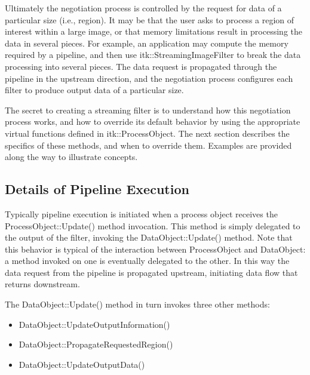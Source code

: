 \begin{figure}
  \par\centering
  \par
\end{figure}


Ultimately the negotiation process is controlled by the request for data of a
particular size (i.e., region). It may be that the user asks to process a
region of interest within a large image, or that memory limitations result in
processing the data in several pieces. For example, an application may
compute the memory required by a pipeline, and then use
itk::StreamingImageFilter to break the data processing into several pieces.
The data request is propagated through the pipeline in the upstream
direction, and the negotiation process configures each filter to produce
output data of a particular size.

The secret to creating a streaming filter is to understand how this
negotiation process works, and how to override its default behavior by using
the appropriate virtual functions defined in itk::ProcessObject. The next
section describes the specifics of these methods, and when to override
them. Examples are provided along the way to illustrate concepts.


\subsection{Details of Pipeline Execution}
\label{sec:DetailsPipelineExecution}

Typically pipeline execution is initiated when a process object receives the
ProcessObject::Update() method invocation. This method is simply delegated to
the output of the filter, invoking the DataObject::Update() method. Note that
this behavior is typical of the interaction between ProcessObject and
DataObject: a method invoked on one is eventually delegated to the other. In
this way the data request from the pipeline is propagated upstream,
initiating data flow that returns downstream.

The DataObject::Update() method in turn invokes three other methods:

\begin{itemize}
        \item DataObject::UpdateOutputInformation()
        \item DataObject::PropagateRequestedRegion()
        \item DataObject::UpdateOutputData()
\end{itemize}

